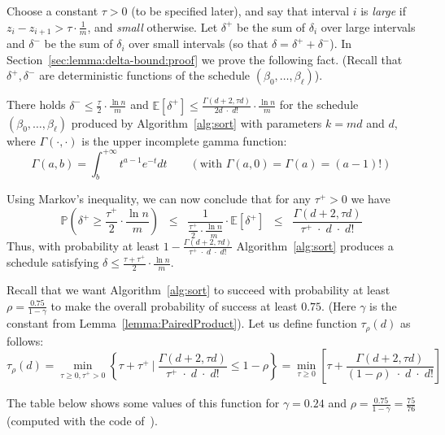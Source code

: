 \documentclass[final,12pt]{colt2018}
\def\E{{\mathbb E}}
\def\P{{\mathbb P}}
\begin{document}
Choose a constant $\tau>0$ (to be specified later), and say that interval $i$ is {\em large} if $z_i-z_{i+1}>\tau\cdot\frac{1}{m}$, and {\em small} otherwise.
Let $\delta^+$ be the sum of $\delta_i$ over large intervals and $\delta^-$ be the sum of $\delta_i$ over small intervals
(so that $\delta=\delta^++\delta^-$).
In Section~\ref{sec:lemma:delta-bound:proof} we prove the following fact. %
(Recall that $\delta^+,\delta^-$ are deterministic functions of the schedule $(\beta_0,\ldots,\beta_\ell)$).
\begin{lemma}\label{lemma:delta-bound}
There holds $\delta^-\le\frac{\tau}2\cdot\frac{\ln n}m$ and 
$
\E[\delta^+]\le  \frac{\Gamma(d+2,\tau d)}{2d\;\cdot \;d!}\cdot\frac{\ln n}m
$
for the schedule $(\beta_0,\ldots,\beta_\ell)$ produced by Algorithm~\ref{alg:sort} with parameters $k=md$ and $d$,
where $\Gamma(\cdot,\cdot)$ is the upper incomplete gamma function:
$$
\Gamma(a,b)=\int_b^{+\infty}t^{a-1}e^{-t}dt\qquad (\mbox{with }\Gamma(a,0)=\Gamma(a)=(a-1)!)
$$
\end{lemma}
Using Markov's inequality, we can now conclude that for any $\tau^+>0$ we have
$$
\P(\delta^+ \ge \mbox{$\frac{\tau^+}2$}\cdot\mbox{$\frac{\ln n}m$})
\;\;\le\;\;\frac{1}{\frac{\tau^+}2\cdot\mbox{$\frac{\ln n}m$}}\cdot \E[\delta^+]
\;\;\le\;\;  \frac{\Gamma(d+2,\tau d)}{\tau^+\;\cdot\; d\;\cdot \;d!}
$$
Thus, with probability at least $1- \frac{\Gamma(d+2,\tau d)}{\tau^+\;\cdot\; d\;\cdot \;d!}$ Algorithm~\ref{alg:sort}
produces a schedule satisfying $\delta \le \frac{\tau+\tau^+}2\cdot\frac{\ln n}m$.

Recall that we want Algorithm~\ref{alg:sort} to succeed with probability at least $\rho=\frac{0.75}{1-\gamma}$
to make the overall probability of success at least $0.75$. (Here $\gamma$ is the constant from Lemma~\ref{lemma:PairedProduct}).
Let us define function $\tau_\rho(d)$ as follows:
$$
\tau_\rho(d) 
= \min_{\tau\ge 0,\tau^+>0} \left\{\tau+\tau^+\:|\: \mbox{$\frac{\Gamma(d+2,\tau d)}{\tau^+\;\cdot\; d\;\cdot \;d!}$} \le 1-\rho\right\}
= \min_{\tau\ge 0} \left[\tau+ \mbox{$\frac{\Gamma(d+2,\tau d)}{(1-\rho)\;\cdot\; d\;\cdot \;d!}$} \right]
$$

The table below shows some values of this function for $\gamma=0.24$ and $\rho=\frac{0.75}{1-\gamma}=\frac{75}{76}$ (computed with the code of~\cite{GammaIntegral}).
\end{document}
